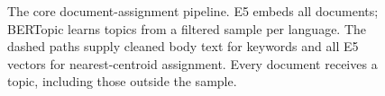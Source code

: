 \begin{figure}[!tb]
\caption{The core document-assignment pipeline. E5 embeds all documents; BERTopic learns topics
from a filtered sample per language. The dashed paths supply cleaned body text for keywords
and all E5 vectors for nearest-centroid assignment. Every document receives a topic, including
those outside the sample.}
\label{fig:pipeline}
\end{figure}
